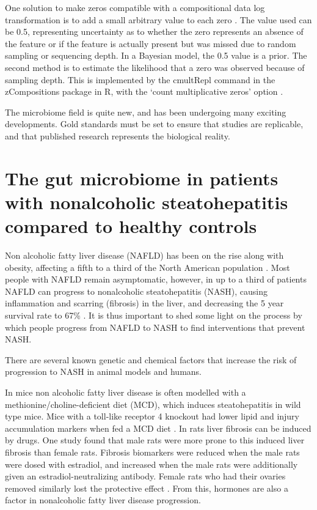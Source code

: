One solution to make zeros compatible with a compositional data log transformation is to add a small arbitrary value to each zero \cite{aitchison1982statistical}. The value used can be 0.5, representing uncertainty as to whether the zero represents an absence of the feature or if the feature is actually present but was missed due to random sampling or sequencing depth. In a Bayesian model, the 0.5 value is a prior. The second method is to estimate the likelihood that a zero was observed because of sampling depth. This is implemented by the cmultRepl command in the zCompositions package in R, with the `count multiplicative zeros' option \cite{palarea2015zcompositions}.

The microbiome field is quite new, and has been undergoing many exciting developments. Gold standards must be set to ensure that studies are replicable, and that published research represents the biological reality.

\section{The gut microbiome in patients with nonalcoholic steatohepatitis compared to healthy controls}
Non alcoholic fatty liver disease (NAFLD) has been on the rise along with obesity, affecting a fifth to a third of the North American population \cite{preiss2008non}. Most people with NAFLD remain asymptomatic, however, in up to a third of patients NAFLD can progress to nonalcoholic steatohepatitis (NASH), causing inflammation and scarring (fibrosis) in the liver, and decreasing the 5 year survival rate to 67\% \cite{propst1995prognosis}. It is thus important to shed some light on the process by which people progress from NAFLD to NASH to find interventions that prevent NASH.

There are several known genetic and chemical factors that increase the risk of progression to NASH in animal models and humans.

In mice non alcoholic fatty liver disease is often modelled with a methionine/choline-deficient diet (MCD), which induces steatohepatitis in wild type mice. Mice with a toll-like receptor 4 knockout had lower lipid and injury accumulation markers when fed a MCD diet \cite{rivera2007toll}. In rats liver fibrosis can be induced by drugs. One study found that male rats were more prone to this induced liver fibrosis than female rats. Fibrosis biomarkers were reduced when the male rats were dosed with estradiol, and increased when the male rats were additionally given an estradiol-neutralizing antibody. Female rats who had their ovaries removed similarly lost the protective effect \cite{yasuda1999suppressive}. From this, hormones are also a factor in nonalcoholic fatty liver disease progression.

